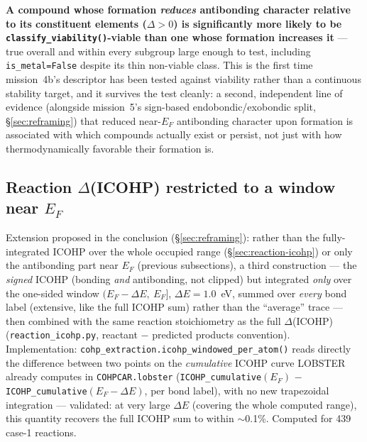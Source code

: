 \documentclass[11pt,a4paper]{article}
\begin{document}
\textbf{A compound whose formation \emph{reduces} antibonding character
relative to its constituent elements ($\Delta>0$) is significantly more
likely to be \texttt{classify\_viability()}-viable than one whose
formation increases it} --- true overall and within every subgroup large
enough to test, including \texttt{is\_metal=False} despite its thin
non-viable class. This is the first time mission~4b's descriptor has
been tested against viability rather than a continuous stability target,
and it survives the test cleanly: a second, independent line of evidence
(alongside mission~5's sign-based endobondic/exobondic split,
\S\ref{sec:reframing}) that reduced near-$E_F$ antibonding character upon
formation is associated with which compounds actually exist or persist,
not just with how thermodynamically favorable their formation is.

\subsection{Reaction $\Delta$(ICOHP) restricted to a window near $E_F$}
\label{sec:reaction-icohp-windowed}

Extension proposed in the conclusion (\S\ref{sec:reframing}): rather
than the fully-integrated ICOHP over the whole occupied range
(\S\ref{sec:reaction-icohp}) or only the antibonding part near $E_F$
(previous subsections), a third construction --- the \emph{signed}
ICOHP (bonding \emph{and} antibonding, not clipped) but integrated
\emph{only} over the one-sided window $(E_F-\Delta E,\ E_F]$,
$\Delta E=1.0$~eV, summed over \emph{every} bond label (extensive, like
the full ICOHP sum) rather than the ``average'' trace --- then
combined with the same reaction stoichiometry as the full
$\Delta$(ICOHP) (\texttt{reaction\_icohp.py}, reactant $-$ predicted
products convention). Implementation:
\texttt{cohp\_extraction.icohp\_windowed\_per\_atom()} reads directly
the difference between two points on the \emph{cumulative} ICOHP curve
LOBSTER already computes in \texttt{COHPCAR.lobster}
(\texttt{ICOHP\_cumulative}$(E_F)$ $-$
\texttt{ICOHP\_cumulative}$(E_F-\Delta E)$, per bond label), with no
new trapezoidal integration --- validated: at very large $\Delta E$
(covering the whole computed range), this quantity recovers the full
ICOHP sum to within $\sim$0.1\%. Computed for 439 case-1 reactions.
\end{document}
